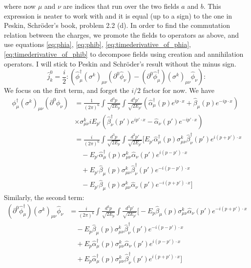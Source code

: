 where now $\mu$ and $\nu$ are indices that run over the two fields $a$ and $b$. This expression is neater to work with and it is equal (up to a sign) to the one in Peskin, Schr\"{o}der's book, problem 2.2 (d).
In order to find the commutation relation between the charges, we promote the fields to operators as above, 
and use equations \eqref{eq:phia}, \eqref{eq:phib}, \eqref{eq:timederivative_of_phia}, \eqref{eq:timederivative_of_phib} to decompose fields using 
creation and annihilation operators.
I will stick to Peskin and Schr\"{o}der's result without the minus sign. 
\[
\hat j_k^0 = \frac{i}{2} :( \hat \phi^\dagger _\mu (\sigma^k)_{\mu\nu}( \partial^0 \hat \phi_\nu) - (\partial^0 \hat \phi_\mu^\dagger)(\sigma^k)_{\mu\nu}\hat \phi_\nu ):
\]
We focus on the first term, and forget the $i/2$ factor for now.
We have
\begin{equation}
\begin{split}
\nonumber
    \phi^\dagger _\mu (\sigma^k)_{\mu\nu}( \partial^0 \phi_\nu) &= \frac{1}{(2\pi)^6} \int \frac{d^3 p}{\sqrt{2E_p}} \int \frac{d^3 p'}{\sqrt{2E_{p'}}} \left( \hat{\alpha}_\mu^\dagger (p) e^{ip\cdot x} + \hat{\beta}_\mu (p) e^{-ip\cdot x} \right)\\
    &\times \sigma^k_{\mu\nu} iE_{p'} \left(\hat{\beta}_\nu^\dagger (p') e^{ip'\cdot x} - \hat{\alpha}_\nu (p') e^{-ip'\cdot x}\right)
    \\
    &=\frac{i}{(2\pi)^6} \int \frac{d^3 p}{\sqrt{2E_p}} \int \frac{d^3 p'}{\sqrt{2E_{p'}}} \bigg[ E_{p'} \hat{\alpha}_\mu^\dagger (p) \sigma^k_{\mu\nu} \hat{\beta}_\nu^\dagger (p') e^{i(p+p')\cdot x} \\
    &\quad - E_{p'} \hat{\alpha}_\mu^\dagger (p) \sigma^k_{\mu\nu} \hat{\alpha}_\nu (p') e^{i(p-p')\cdot x} \\
    &\quad + E_{p'} \hat{\beta}_\mu (p) \sigma^k_{\mu\nu} \hat{\beta}_\nu^\dagger (p') e^{-i(p-p')\cdot x} \\
    &\quad - E_{p'} \hat{\beta}_\mu (p) \sigma^k_{\mu\nu} \hat{\alpha}_\nu (p') e^{-i(p+p')\cdot x} \bigg]
\end{split}
\end{equation}
Similarly, the second term:
\begin{equation}
    \nonumber
\begin{split}
    (\partial^0 \hat{\phi}_\mu^\dagger)(\sigma^k)_{\mu\nu}\hat{\phi}_\nu &= \frac{i}{(2\pi)^6} \int \frac{d^3 p}{\sqrt{2E_p}} \int \frac{d^3 p'}{\sqrt{2E_{p'}}} \bigg[ - E_p \hat{\beta}_\mu (p) \sigma^k_{\mu\nu} \hat{\alpha}_\nu (p') e^{-i(p+p')\cdot x} \\
    &\quad - E_p \hat{\beta}_\mu (p) \sigma^k_{\mu\nu} \hat{\beta}_\nu^\dagger (p') e^{-i(p-p')\cdot x} \\
    &\quad + E_p \hat{\alpha}_\mu^\dagger (p) \sigma^k_{\mu\nu} \hat{\alpha}_\nu (p') e^{i(p-p')\cdot x} \\
    &\quad + E_p \hat{\alpha}_\mu^\dagger (p) \sigma^k_{\mu\nu} \hat{\beta}_\nu^\dagger (p') e^{i(p+p')\cdot x} \bigg]
\end{split}
\end{equation}
